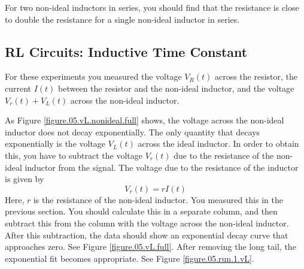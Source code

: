 For two non-ideal inductors in series, you should find that the resistance is close to double the resistance for a single non-ideal inductor in series. 
%
\subsection{RL Circuits: Inductive Time Constant}
%
For these experiments you measured the voltage $V_{R}(t)$ across the resistor, the current $I(t)$ between the resistor and the non-ideal inductor, and the voltage $V_{r}(t) + V_{L}(t)$ across the non-ideal inductor.

As Figure \ref{figure.05.vL.nonideal.full} shows, the voltage across the non-ideal inductor does not decay exponentially. The only quantity that decays exponentially is the voltage $V_{L}(t)$ across the ideal inductor. In order to obtain this, you have to subtract the voltage $V_{r}(t)$ due to the resistance of the non-ideal inductor from the signal. The voltage due to the resistance of the inductor is given by
\begin{equation}
    V_{r}(t) = r I(t)
\end{equation}
Here, $r$ is the resistance of the non-ideal inductor. You measured this in the previous section. You should calculate this in a separate column, and then subtract this from the column with the voltage across the non-ideal inductor. After this subtraction, the data should show an exponential decay curve that approaches zero. See Figure \ref{figure.05.vL.full}. After removing the long tail, the exponential fit becomes appropriate. See Figure \ref{figure.05.run.1.vL}.
%
